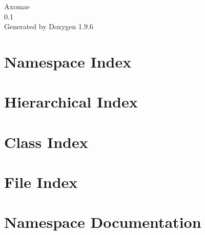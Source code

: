 \documentclass[twoside]{book}
\newcommand{\+}{\discretionary{\mbox{\scriptsize$\hookleftarrow$}}{}{}}
\newcommand{\clearemptydoublepage}{%
    \newpage{\pagestyle{empty}\cleardoublepage}%
  }
\begin{document}
  \raggedbottom
    \hypersetup{pageanchor=false,
                bookmarksnumbered=true,
                pdfencoding=unicode
               }
  \begin{titlepage}
  \vspace*{7cm}
  \begin{center}%
  {\Large Axomae}\\
  [1ex]\large 0.\+1 \\
  \vspace*{1cm}
  {\large Generated by Doxygen 1.9.6}\\
  \end{center}
  \end{titlepage}
  \clearemptydoublepage
  \tableofcontents
  \clearemptydoublepage
  \hypersetup{pageanchor=true}
\chapter{Namespace Index}

\chapter{Hierarchical Index}

\chapter{Class Index}

\chapter{File Index}

\chapter{Namespace Documentation}

\end{document}
